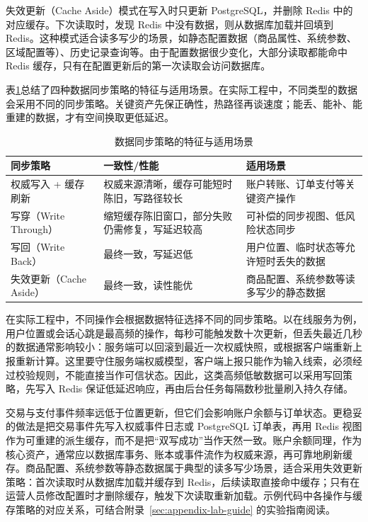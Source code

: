 失效更新（Cache Aside）模式在写入时只更新 PostgreSQL，并删除 Redis 中的对应缓存。下次读取时，发现 Redis 中没有数据，则从数据库加载并回填到 Redis。这种模式适合读多写少的场景，如静态配置数据（商品属性、系统参数、区域配置等）、历史记录查询等。由于配置数据很少变化，大部分读取都能命中 Redis 缓存，只有在配置更新后的第一次读取会访问数据库。

表\ref{tab:sync-strategy}总结了四种数据同步策略的特征与适用场景。在实际工程中，不同类型的数据会采用不同的同步策略。关键资产先保正确性，热路径再谈速度；能丢、能补、能重建的数据，才有空间换取更低延迟。

\begin{table}[H]
\centering
\caption{数据同步策略的特征与适用场景}
\label{tab:sync-strategy}
\begin{tabular}{p{3.5cm}p{4cm}p{5cm}}
\hline
同步策略 & 一致性/性能 & 适用场景 \\
\hline
权威写入 + 缓存刷新 & 权威来源清晰，缓存可能短时陈旧，写路径较长 & 账户转账、订单支付等关键资产操作 \\
写穿（Write Through） & 缩短缓存陈旧窗口，部分失败仍需修复，写延迟较高 & 可补偿的同步视图、低风险状态同步 \\
写回（Write Back） & 最终一致，写延迟低 & 用户位置、临时状态等允许短时丢失的数据 \\
失效更新（Cache Aside） & 最终一致，读性能优 & 商品配置、系统参数等读多写少的静态数据 \\
\hline
\end{tabular}
\end{table}

在实际工程中，不同操作会根据数据特征选择不同的同步策略。以在线服务为例，用户位置或会话心跳是最高频的操作，每秒可能触发数十次更新，但丢失最近几秒的数据通常影响较小：服务端可以回滚到最近一次权威快照，或根据客户端重新上报重新计算。这里要守住服务端权威模型，客户端上报只能作为输入线索，必须经过校验规则，不能直接当作可信状态。因此，这类高频低敏数据可以采用写回策略，先写入 Redis 保证低延迟响应，再由后台任务每隔数秒批量刷入持久存储。

交易与支付事件频率远低于位置更新，但它们会影响账户余额与订单状态。更稳妥的做法是把交易事件先写入权威事件日志或 PostgreSQL 订单表，再用 Redis 视图作为可重建的派生缓存，而不是把“双写成功”当作天然一致。账户余额同理，作为核心资产，通常应以数据库事务、账本或事件流作为权威来源，再可靠地刷新缓存。商品配置、系统参数等静态数据属于典型的读多写少场景，适合采用失效更新策略：首次读取时从数据库加载并缓存到 Redis，后续读取直接命中缓存；只有在运营人员修改配置时才删除缓存，触发下次读取重新加载。示例代码中各操作与缓存策略的对应关系，可结合附录~\ref{sec:appendix-lab-guide} 的实验指南阅读。

